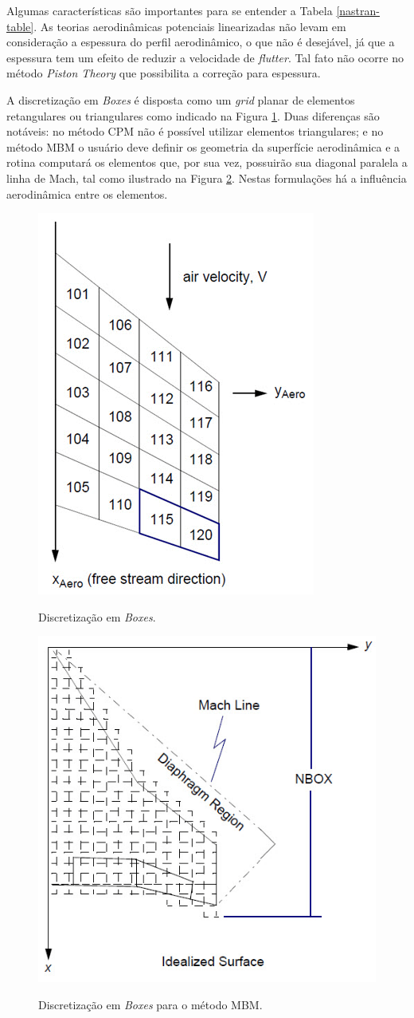 Algumas características são importantes para se entender a Tabela \ref{nastran-table}.
As teorias aerodinâmicas potenciais linearizadas não levam em consideração a espessura do perfil aerodinâmico, o que não é desejável, já que a espessura tem um efeito de reduzir a velocidade de \emph{flutter}. Tal fato não ocorre no método \emph{Piston Theory} que possibilita a correção para espessura.

A discretização em \emph{Boxes} é disposta como um \emph{grid} planar de elementos retangulares
ou triangulares como indicado na Figura \ref{fig-boxes}.
Duas diferenças são notáveis: no método CPM não é possível utilizar elementos triangulares;
e no método MBM o usuário deve definir os geometria da superfície aerodinâmica e a rotina computará os elementos que, por sua vez, possuirão sua 
diagonal paralela a linha de Mach, tal como ilustrado na Figura \ref{fig-mach-boxes}.
Nestas formulações há a influência aerodinâmica entre os elementos.

\begin{figure}[H]
\centering
\caption{Discretização em \emph{Boxes}.}
\includegraphics[width=0.4\linewidth]{figures/boxes.png}
\label{fig-boxes}
\end{figure}

\begin{figure}[H]
\centering
\caption{Discretização em \emph{Boxes} para o método MBM.}
\includegraphics[width=0.5\linewidth]{figures/mach-boxes.png}
\label{fig-mach-boxes}
\end{figure}

